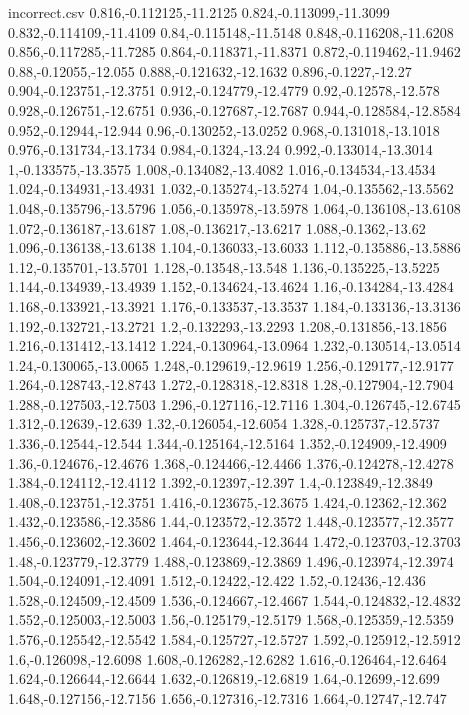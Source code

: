 \begin{filecontents*}{incorrect.csv}
0.816,-0.112125,-11.2125
0.824,-0.113099,-11.3099
0.832,-0.114109,-11.4109
0.84,-0.115148,-11.5148
0.848,-0.116208,-11.6208
0.856,-0.117285,-11.7285
0.864,-0.118371,-11.8371
0.872,-0.119462,-11.9462
0.88,-0.12055,-12.055
0.888,-0.121632,-12.1632
0.896,-0.1227,-12.27
0.904,-0.123751,-12.3751
0.912,-0.124779,-12.4779
0.92,-0.12578,-12.578
0.928,-0.126751,-12.6751
0.936,-0.127687,-12.7687
0.944,-0.128584,-12.8584
0.952,-0.12944,-12.944
0.96,-0.130252,-13.0252
0.968,-0.131018,-13.1018
0.976,-0.131734,-13.1734
0.984,-0.1324,-13.24
0.992,-0.133014,-13.3014
1,-0.133575,-13.3575
1.008,-0.134082,-13.4082
1.016,-0.134534,-13.4534
1.024,-0.134931,-13.4931
1.032,-0.135274,-13.5274
1.04,-0.135562,-13.5562
1.048,-0.135796,-13.5796
1.056,-0.135978,-13.5978
1.064,-0.136108,-13.6108
1.072,-0.136187,-13.6187
1.08,-0.136217,-13.6217
1.088,-0.1362,-13.62
1.096,-0.136138,-13.6138
1.104,-0.136033,-13.6033
1.112,-0.135886,-13.5886
1.12,-0.135701,-13.5701
1.128,-0.13548,-13.548
1.136,-0.135225,-13.5225
1.144,-0.134939,-13.4939
1.152,-0.134624,-13.4624
1.16,-0.134284,-13.4284
1.168,-0.133921,-13.3921
1.176,-0.133537,-13.3537
1.184,-0.133136,-13.3136
1.192,-0.132721,-13.2721
1.2,-0.132293,-13.2293
1.208,-0.131856,-13.1856
1.216,-0.131412,-13.1412
1.224,-0.130964,-13.0964
1.232,-0.130514,-13.0514
1.24,-0.130065,-13.0065
1.248,-0.129619,-12.9619
1.256,-0.129177,-12.9177
1.264,-0.128743,-12.8743
1.272,-0.128318,-12.8318
1.28,-0.127904,-12.7904
1.288,-0.127503,-12.7503
1.296,-0.127116,-12.7116
1.304,-0.126745,-12.6745
1.312,-0.12639,-12.639
1.32,-0.126054,-12.6054
1.328,-0.125737,-12.5737
1.336,-0.12544,-12.544
1.344,-0.125164,-12.5164
1.352,-0.124909,-12.4909
1.36,-0.124676,-12.4676
1.368,-0.124466,-12.4466
1.376,-0.124278,-12.4278
1.384,-0.124112,-12.4112
1.392,-0.12397,-12.397
1.4,-0.123849,-12.3849
1.408,-0.123751,-12.3751
1.416,-0.123675,-12.3675
1.424,-0.12362,-12.362
1.432,-0.123586,-12.3586
1.44,-0.123572,-12.3572
1.448,-0.123577,-12.3577
1.456,-0.123602,-12.3602
1.464,-0.123644,-12.3644
1.472,-0.123703,-12.3703
1.48,-0.123779,-12.3779
1.488,-0.123869,-12.3869
1.496,-0.123974,-12.3974
1.504,-0.124091,-12.4091
1.512,-0.12422,-12.422
1.52,-0.12436,-12.436
1.528,-0.124509,-12.4509
1.536,-0.124667,-12.4667
1.544,-0.124832,-12.4832
1.552,-0.125003,-12.5003
1.56,-0.125179,-12.5179
1.568,-0.125359,-12.5359
1.576,-0.125542,-12.5542
1.584,-0.125727,-12.5727
1.592,-0.125912,-12.5912
1.6,-0.126098,-12.6098
1.608,-0.126282,-12.6282
1.616,-0.126464,-12.6464
1.624,-0.126644,-12.6644
1.632,-0.126819,-12.6819
1.64,-0.12699,-12.699
1.648,-0.127156,-12.7156
1.656,-0.127316,-12.7316
1.664,-0.12747,-12.747

\end{filecontents*}
